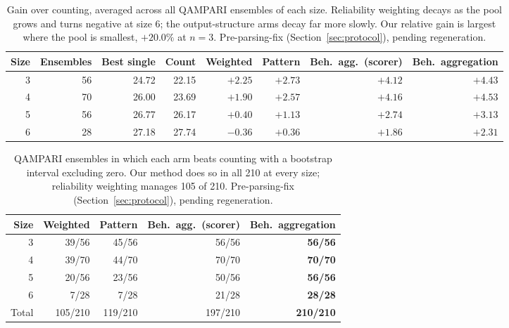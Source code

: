 \documentclass{article}
\begin{document}
\begin{table}
  \caption{Gain over counting, averaged across all QAMPARI ensembles of each size. Reliability weighting decays as the pool grows and turns negative at size 6; the output-structure arms decay far more slowly. Our relative gain is largest where the pool is smallest, $+20.0\%$ at $n=3$. Pre-parsing-fix (Section~\ref{sec:protocol}), pending regeneration.}
  \label{tab:ens-gain}
  \centering
  \begin{tabular}{rrrrrrrr}
    \toprule
    Size & Ensembles & Best single & Count & Weighted & Pattern & Beh.\ agg.\ (scorer) & Beh.\ aggregation \\
    \midrule
    3 & 56 & 24.72 & 22.15 & $+2.25$ & $+2.73$ & $+4.12$ & $\mathbf{+4.43}$ \\
    4 & 70 & 26.00 & 23.69 & $+1.90$ & $+2.57$ & $+4.16$ & $\mathbf{+4.53}$ \\
    5 & 56 & 26.77 & 26.17 & $+0.40$ & $+1.13$ & $+2.74$ & $\mathbf{+3.13}$ \\
    6 & 28 & 27.18 & 27.74 & $-0.36$ & $+0.36$ & $+1.86$ & $\mathbf{+2.31}$ \\
    \bottomrule
  \end{tabular}
\end{table}
\begin{table}
  \caption{QAMPARI ensembles in which each arm beats counting with a bootstrap interval excluding zero. Our method does so in all 210 at every size; reliability weighting manages 105 of 210. Pre-parsing-fix (Section~\ref{sec:protocol}), pending regeneration.}
  \label{tab:ens-sig}
  \centering
  \begin{tabular}{rrrrr}
    \toprule
    Size & Weighted & Pattern & Beh.\ agg.\ (scorer) & Beh.\ aggregation \\
    \midrule
    3 & 39/56 & 45/56 & 56/56 & \textbf{56/56} \\
    4 & 39/70 & 44/70 & 70/70 & \textbf{70/70} \\
    5 & 20/56 & 23/56 & 50/56 & \textbf{56/56} \\
    6 &  7/28 &  7/28 & 21/28 & \textbf{28/28} \\
    \midrule
    Total & 105/210 & 119/210 & 197/210 & \textbf{210/210} \\
    \bottomrule
  \end{tabular}
\end{table}
\end{document}
